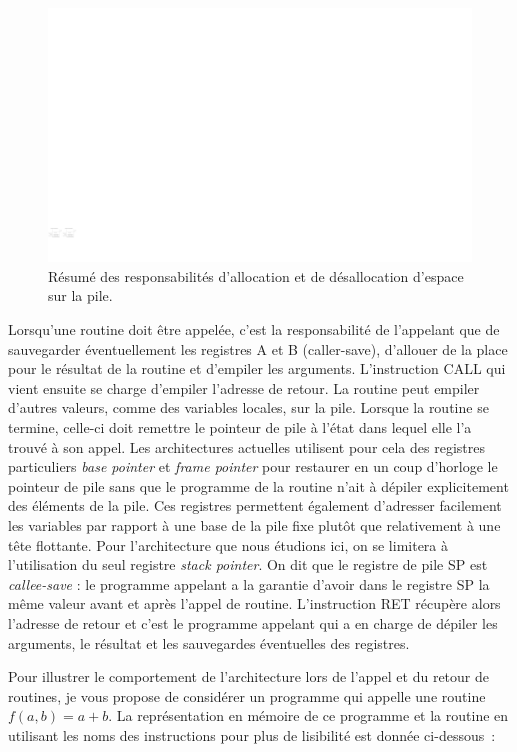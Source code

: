 \begin{figure}[htbp]
\centering\includegraphics[width=\linewidth]{Figs/respo_pile.pdf}
\caption{\label{fig:respo_pile} Résumé des responsabilités d'allocation et de désallocation d'espace sur la pile.}
\end{figure}

Lorsqu'une routine doit être appelée, c'est la responsabilité de l'appelant que de sauvegarder éventuellement les registres A et B (caller-save), d'allouer de la place pour le résultat de la routine et d'empiler les arguments. L'instruction CALL qui vient ensuite se charge d'empiler l'adresse de retour. La routine peut empiler d'autres valeurs, comme des variables locales, sur la pile. Lorsque la routine se termine, celle-ci doit remettre le pointeur de pile à l'état dans lequel elle l'a trouvé à son appel. Les architectures actuelles utilisent pour cela des registres particuliers \emph{base pointer} et \emph{frame pointer} pour restaurer en un coup d'horloge le pointeur de pile sans que le programme de la routine n'ait à dépiler explicitement des éléments de la pile. Ces registres permettent également d'adresser facilement les variables par rapport à une base de la pile fixe plutôt que relativement à une tête flottante. Pour l'architecture que nous étudions ici, on se limitera à l'utilisation du seul registre \emph{stack pointer}. On dit que le registre de pile SP est \emph{callee-save} : le programme appelant a la garantie d'avoir dans le registre SP la même valeur avant et après l'appel de routine. L'instruction RET récupère alors l'adresse de retour et c'est le programme appelant qui a en charge de dépiler les arguments, le résultat et les sauvegardes éventuelles des registres.



Pour illustrer le comportement de l'architecture lors de l'appel et du retour de routines, je vous propose de considérer un programme qui appelle une routine $f(a,b) = a+b$. La représentation en mémoire de ce programme et la routine en utilisant les noms des instructions pour plus de lisibilité est donnée ci-dessous~:

